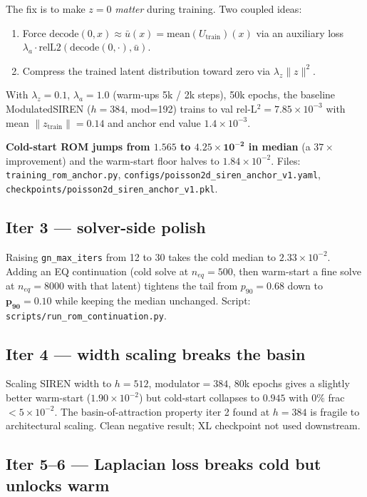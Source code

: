 \documentclass[11pt]{article}
\begin{document}
The fix is to make $z=0$ \emph{matter} during training. Two coupled
ideas:
\begin{enumerate}
\item Force $\text{decode}(0,x) \approx \bar u(x) =
      \text{mean}(U_{\text{train}})(x)$ via an auxiliary loss
      $\lambda_a \cdot \text{relL2}(\text{decode}(0,\cdot),\bar u)$.
\item Compress the trained latent distribution toward zero via
      $\lambda_z \|z\|^2$.
\end{enumerate}

With $\lambda_z=0.1$, $\lambda_a=1.0$ (warm-ups 5k / 2k steps), 50k
epochs, the baseline ModulatedSIREN ($h=384$, mod=192) trains to
val rel-L${}^2 = 7.85 \times 10^{-3}$ with mean
$\|z_{\text{train}}\|=0.14$ and anchor end value $1.4\times 10^{-3}$.

\textbf{Cold-start ROM jumps from $1.565$ to $\mathbf{4.25 \times
10^{-2}}$ in median} (a $37\times$ improvement) and the warm-start
floor halves to $1.84\times 10^{-2}$. Files:
\texttt{training\_rom\_anchor.py},
\texttt{configs/poisson2d\_siren\_anchor\_v1.yaml},
\texttt{checkpoints/poisson2d\_siren\_anchor\_v1.pkl}.

\subsection{Iter 3 --- solver-side polish}

Raising \texttt{gn\_max\_iters} from 12 to 30 takes the cold median to
$2.33\times 10^{-2}$. Adding an EQ continuation (cold solve at
$n_{eq}=500$, then warm-start a fine solve at $n_{eq}=8000$ with that
latent) tightens the tail from $p_{90}=0.68$ down to
$\boldsymbol{p_{90}=0.10}$ while keeping the median unchanged. Script:
\texttt{scripts/run\_rom\_continuation.py}.

\subsection{Iter 4 --- width scaling breaks the basin}

Scaling SIREN width to $h=512$, modulator$=384$, 80k epochs gives a
slightly better warm-start ($1.90\times 10^{-2}$) but cold-start
collapses to $0.945$ with $0\%$ frac\,$<5\times 10^{-2}$. The
basin-of-attraction property iter 2 found at $h=384$ is fragile to
architectural scaling. Clean negative result; XL checkpoint not used
downstream.

\subsection{Iter 5--6 --- Laplacian loss breaks cold but unlocks warm}
\end{document}
